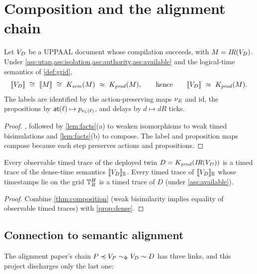 \section{Composition and the alignment chain}\label{sec:composition}

\begin{theorem}\label{thm:composition}
Let $V_D$ be a UPPAAL document whose compilation succeeds, with $M=\mathit{IR}(V_D)$.
Under \cref{ass:utap,ass:isolation,ass:authority,ass:available} and the
logical-time semantics of \cref{def:grid},
\[
  \sem{\VD}\ \iso\ \sem{M}\ \iso\ \Ksem(M)\ \wbis\ \Kprod(M),
  \qquad\text{hence}\qquad \sem{\VD}\ \wbis\ \Kprod(M).
\]
The labels are identified by the action-preserving maps $\nu_{\mathit{E}}$ and
$\mathrm{id}$, the propositions by $\mathsf{at}(\ell)\mapsto p_{\nu_{\mathit{L}}(\ell)}$, and delays by
$d\mapsto dR$ ticks.
\end{theorem}
\begin{proof}
, followed by \cref{lem:facts}(a)
to weaken isomorphisms to weak timed bisimulations and \cref{lem:facts}(b) to
compose. The label and proposition maps compose because each step preserves
actions and propositions.
\end{proof}

\begin{corollary}\label{cor:traces}
Every observable timed trace of the deployed twin $D=K_{\mathit{prod}}(\mathit{IR}(V_D))$ is a timed
trace of the dense-time semantics $\llbracket V_D \rrbracket_{\mathbb{R}}$. Every timed trace of
$\llbracket V_D \rrbracket_{\mathbb{R}}$ whose timestamps lie on the grid $\mathbb{T}_R^{H}$ is a timed trace of $D$
(under \cref{ass:available}).
\end{corollary}
\begin{proof}
Combine \cref{thm:composition} (weak bisimilarity implies equality of observable
timed traces) with \cref{prop:dense}.
\end{proof}

\subsection{Connection to semantic alignment}

The alignment paper's chain $P\preccurlyeq V_P\sim_{\Phi}V_D\sim D$ has three links, and
this project discharges only the last one:

